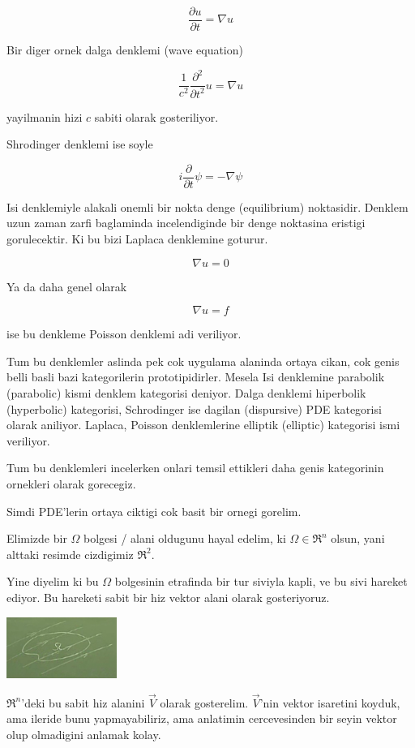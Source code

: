 \documentclass[12pt,fleqn]{article}
\begin{document}
\[ \frac{\partial u}{\partial t} = 
\nabla  u
\]

Bir diger ornek dalga denklemi (wave equation)

\[ \frac{1}{c^2} \frac{\partial ^2}{\partial t^2}u = \nabla u\]

yayilmanin hizi $c$ sabiti olarak gosteriliyor. 

Shrodinger denklemi ise soyle

\[ i \frac{\partial }{\partial t}\psi  = -\nabla \psi \]

Isi denklemiyle alakali onemli bir nokta denge (equilibrium)
noktasidir. Denklem uzun zaman zarfi baglaminda incelendiginde bir denge
noktasina eristigi gorulecektir. Ki bu bizi Laplaca denklemine goturur. 

\[ \nabla u = 0 \]

Ya da daha genel olarak 

\[ \nabla u = f \]

ise bu denkleme Poisson denklemi adi veriliyor. 

Tum bu denklemler aslinda pek cok uygulama alaninda ortaya cikan, cok genis
belli basli bazi kategorilerin prototipidirler. Mesela Isi denklemine
parabolik (parabolic) kismi denklem kategorisi deniyor. Dalga denklemi
hiperbolik (hyperbolic) kategorisi, Schrodinger ise dagilan (dispursive)
PDE kategorisi olarak aniliyor. Laplaca, Poisson denklemlerine elliptik
(elliptic) kategorisi ismi veriliyor. 

Tum bu denklemleri incelerken onlari temsil ettikleri daha genis
kategorinin ornekleri olarak gorecegiz. 

Simdi PDE'lerin ortaya ciktigi cok basit bir ornegi gorelim. 

Elimizde bir $\Omega$ bolgesi / alani oldugunu hayal edelim, ki $\Omega \in
\Re^n$ olsun, 
yani alttaki resimde cizdigimiz $\Re^2$.

Yine diyelim ki bu $\Omega$ bolgesinin etrafinda bir tur siviyla kapli, ve
bu sivi hareket ediyor. Bu hareketi sabit bir hiz vektor alani olarak
gosteriyoruz. 

\includegraphics[height=2cm]{1_1.png}

$\Re^n$'deki bu sabit hiz alanini $\vec{V}$ olarak gosterelim. $\vec{V}$'nin vektor isaretini 
koyduk, ama ileride bunu yapmayabiliriz, ama anlatimin cercevesinden bir
seyin  vektor olup olmadigini anlamak kolay. 
\end{document}
